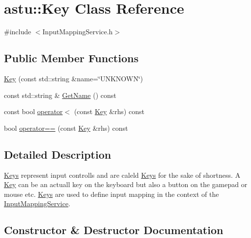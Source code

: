 \hypertarget{classastu_1_1Key}{}\section{astu\+:\+:Key Class Reference}
\label{classastu_1_1Key}


{\ttfamily \#include $<$Input\+Mapping\+Service.\+h$>$}

\subsection*{Public Member Functions}
\begin{DoxyCompactItemize}
\item 
\hyperlink{classastu_1_1Key_a0fda6560cc7930eeda90cb20686ff3a2}{Key} (const std\+::string \&name=\char`\"{}U\+N\+K\+N\+O\+WN\char`\"{})
\item 
const std\+::string \& \hyperlink{classastu_1_1Key_a15315633ef2aaec706ed6fce7fa6ef09}{Get\+Name} () const
\item 
const bool \hyperlink{classastu_1_1Key_a6a139937577f2902bbff264741db0abb}{operator$<$} (const \hyperlink{classastu_1_1Key}{Key} \&rhs) const
\item 
bool \hyperlink{classastu_1_1Key_a7955f202afbf7e947639fc2553b6db53}{operator==} (const \hyperlink{classastu_1_1Key}{Key} \&rhs) const
\end{DoxyCompactItemize}


\subsection{Detailed Description}
\hyperlink{classastu_1_1Keys}{Keys} represent input controlls and are caleld \hyperlink{classastu_1_1Keys}{Keys} for the sake of shortness. A \hyperlink{classastu_1_1Key}{Key} can be an actuall key on the keyboard but also a button on the gamepad or mouse etc. \hyperlink{classastu_1_1Keys}{Keys} are used to define input mapping in the context of the \hyperlink{classastu_1_1InputMappingService}{Input\+Mapping\+Service}. 

\subsection{Constructor \& Destructor Documentation}
\mbox{\label{classastu_1_1Key_a0fda6560cc7930eeda90cb20686ff3a2}} 
